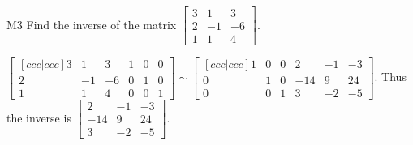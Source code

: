 \documentclass{sbgLAquiz}
\begin{document}
\begin{extract}\newpage\end{extract}
\begin{problem}{M3}
  Find the inverse of the matrix
  \(\begin{bmatrix}
    3 & 1 & 3  \\
    2 & -1 & -6  \\
    1 & 1 & 4
  \end{bmatrix}\).
\end{problem}
\begin{solution}
\(\begin{bmatrix}[ccc|ccc]
  3 & 1 & 3 & 1 & 0 & 0 \\
  2 & -1 & -6 & 0 & 1 & 0 \\
  1 & 1 & 4 & 0 & 0 & 1
\end{bmatrix}\sim\begin{bmatrix}[ccc|ccc]
  1 & 0 & 0 & 2 & -1 & -3  \\
  0 & 1 & 0 & -14 & 9 & 24  \\
  0 & 0 & 1 & 3 & -2 & -5
\end{bmatrix}\). Thus the inverse is
\(\begin{bmatrix}
  2 & -1 & -3  \\
  -14 & 9 & 24  \\
  3 & -2 & -5
\end{bmatrix}\).
\end{solution}
\end{document}
